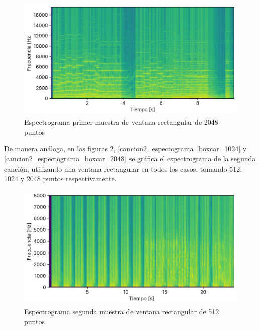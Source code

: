 \documentclass[12pt]{article}
\begin{document}
\begin{figure}[H]
\centering
\includegraphics{plot/cancion1_espectograma_boxcar_2048.png}
\caption{Espectrograma primer muestra de ventana rectangular de 2048 puntos}
\label{cancion1_espectograma_boxcar_2048}
\end{figure}

De manera análoga, en las figuras \ref{cancion2_espectograma_boxcar_0512}, \ref{cancion2_espectograma_boxcar_1024} y \ref{cancion2_espectograma_boxcar_2048} se gráfica el espectrograma de la segunda canción, utilizando una ventana rectangular en todos los casos, tomando 512, 1024 y 2048 puntos respectivamente.

\begin{figure}[H]
\centering
\includegraphics{plot/cancion2_espectograma_boxcar_0512.png}
\caption{Espectrograma segunda muestra de ventana rectangular de 512 puntos}
\label{cancion2_espectograma_boxcar_0512}
\end{figure}
\end{document}
